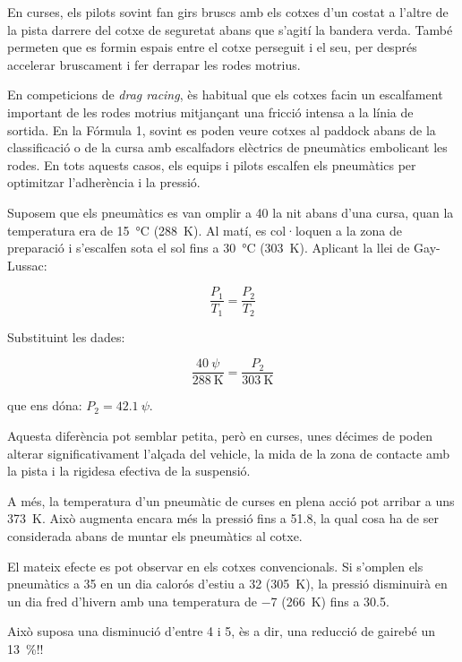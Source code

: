 %
%
      


\begin{mybox}[title=La llei de Gay-Lussac i els pneumàtics de cursa]
 En curses, els pilots sovint fan girs bruscs amb els cotxes d'un costat a l'altre de la pista darrere del cotxe de seguretat abans que s'agit\'i la bandera verda. Tamb\'e permeten que es formin espais entre el cotxe perseguit i el seu, per despr\'es accelerar bruscament i fer derrapar les rodes motrius.

En competicions de {\em drag racing}, \`es habitual que els cotxes facin un escalfament important de les rodes motrius mitjan\c{c}ant una fricci\'o intensa a la l\'inia de sortida. En la F\'ormula 1, sovint es poden veure cotxes al paddock abans de la classificaci\'o o de la cursa amb escalfadors el\`ectrics de pneum\`atics embolicant les rodes. En tots aquests casos, els equips i pilots escalfen els pneum\`atics per optimitzar l'adher\`encia i la pressi\'o.

Suposem que els pneum\`atics es van omplir a \qty{40}{\psi} la nit abans d'una cursa, quan la temperatura era de \qty{15}{\celsius} (\qty{288}{\kelvin}). Al mat\'i, es col·loquen a la zona de preparaci\'o i s'escalfen sota el sol fins a \qty{30}{\celsius} (\qty{303}{\kelvin}). Aplicant la llei de Gay-Lussac:

\begin{equation}
    \frac{P_1}{T_1} = \frac{P_2}{T_2}
\end{equation}

Substituint les dades:

\begin{equation}
    \frac{\qty{40}{\psi}}{\qty{288}{\kelvin}} = \frac{P_2}{\qty{303}{\kelvin}}
\end{equation}

que ens dóna: $P_2 = \qty{42.1}{\psi}$.

Aquesta difer\`encia pot semblar petita, per\`o en curses, unes d\'ecimes de \si{\psi} poden alterar significativament l'al\c{c}ada del vehicle, la mida de la zona de contacte amb la pista i la rigidesa efectiva de la suspensi\'o.

A m\'es, la temperatura d'un pneum\`atic de curses en plena acci\'o pot arribar a uns  \qty{373}{\kelvin}. Aix\`o augmenta encara m\'es la pressi\'o fins a \qty{51.8}{\psi}, la qual cosa ha de ser considerada abans de muntar els pneum\`atics al cotxe.

El mateix efecte es pot observar en els cotxes convencionals. Si s'omplen els pneumàtics a \qty{35}{\psi} en un dia calorós d'estiu a \qty{32}{\degC} (\qty{305}{\kelvin}), la pressió disminuirà en un dia fred d'hivern amb una temperatura de \qty{-7}{\degC} (\qty{266}{\kelvin}) fins a \qty{30.5}{\psi}.

Aix\`o suposa una disminuci\'o d'entre \qty{4}{\psi} i \qty{5}{\psi}, \`es a dir, una reducci\'o de gaireb\'e un \qty{13}{\percent}!!
\end{mybox}

